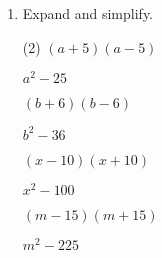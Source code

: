 \begin{enumerate} [leftmargin=0cm]
\begin{tasks}[label=(\alph*), after-item-skip=2pt,after-skip=3pt, label-width=4ex](2)
    \task  $ (a-30)^2   $    \\  \begin{envAnswer} $   a^2 -   60a +   900       $ \end{envAnswer}
    \task  $ (x- 6)^2   $    \\  \begin{envAnswer} $   x^2 -   12x +    36       $ \end{envAnswer}
    \task  $ (m- 5)^2   $    \\  \begin{envAnswer} $   m^2 -   10m +    25       $ \end{envAnswer}
    \task  $ (n- 1)^2   $    \\  \begin{envAnswer} $   n^2 -    2n +     1       $ \end{envAnswer}
\end{tasks}


\item Expand and simplify.
\begin{tasks}[label=(\alph*), after-item-skip=2pt,after-skip=3pt, label-width=4ex](2)
    \task  $ ( a+ 5) (a-5)                 $    \\  \begin{envAnswer} $   a^2   -   25        $ \end{envAnswer}
    \task  $ ( b+ 6) (b-6)                 $    \\  \begin{envAnswer} $   b^2   -   36        $ \end{envAnswer}
    \task  $ ( x-10) (x+10)                $    \\  \begin{envAnswer} $   x^2   -  100        $ \end{envAnswer}
    \task  $ ( m-15) (m+15)                $    \\  \begin{envAnswer} $   m^2   -  225        $ \end{envAnswer}
\end{tasks}




\end{enumerate}
